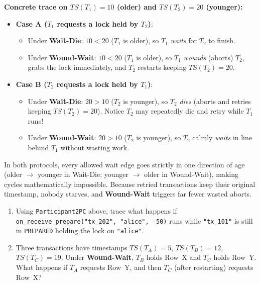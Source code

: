 \textbf{Concrete trace on $TS(T_1)=10$ (older) and $TS(T_2)=20$ (younger):}
\begin{itemize}[leftmargin=18pt]
  \item \textbf{Case A ($T_1$ requests a lock held by $T_2$)}:
  \begin{itemize}[leftmargin=12pt]
    \item Under \textbf{Wait-Die}: $10 < 20$ ($T_1$ is older), so $T_1$ \emph{waits} for $T_2$ to finish.
    \item Under \textbf{Wound-Wait}: $10 < 20$ ($T_1$ is older), so $T_1$ \emph{wounds} (aborts) $T_2$, grabs the lock immediately, and $T_2$ restarts keeping $TS(T_2)=20$.
  \end{itemize}
  \item \textbf{Case B ($T_2$ requests a lock held by $T_1$)}:
  \begin{itemize}[leftmargin=12pt]
    \item Under \textbf{Wait-Die}: $20 > 10$ ($T_2$ is younger), so $T_2$ \emph{dies} (aborts and retries keeping $TS(T_2)=20$). Notice $T_2$ may repeatedly die and retry while $T_1$ runs!
    \item Under \textbf{Wound-Wait}: $20 > 10$ ($T_2$ is younger), so $T_2$ calmly \emph{waits} in line behind $T_1$ without wasting work.
  \end{itemize}
\end{itemize}
In both protocols, every allowed wait edge goes strictly in one direction of age (older $\to$ younger in Wait-Die; younger $\to$ older in Wound-Wait), making cycles mathematically impossible. Because retried transactions keep their original timestamp, nobody starves, and \textbf{Wound-Wait} triggers far fewer wasted aborts.

\begin{tryityourselfbox}
\begin{enumerate}[leftmargin=18pt]
  \item Using \texttt{Participant2PC} above, trace what happens if \texttt{on\_receive\_prepare("tx\_202", "alice", -50)} runs while \texttt{"tx\_101"} is still in \texttt{PREPARED} holding the lock on \texttt{"alice"}.
  \item Three transactions have timestamps $TS(T_A)=5$, $TS(T_B)=12$, $TS(T_C)=19$. Under \textbf{Wound-Wait}, $T_B$ holds Row~X and $T_C$ holds Row~Y. What happens if $T_A$ requests Row~Y, and then $T_C$ (after restarting) requests Row~X?
\end{enumerate}
\end{tryityourselfbox}

